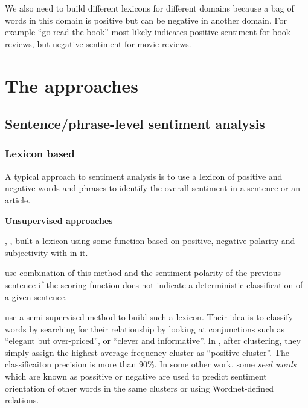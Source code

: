 \documentclass{article}
\begin{document}
\begin{multicols}{2}
    We also need to build different lexicons for different domains
because a bag of words in this domain is positive but can be negative in another
domain. For example ``go read the book'' most likely indicates positive
sentiment for book reviews, but negative sentiment for movie reviews.

 

\section{The approaches}

  \subsection{Sentence/phrase-level sentiment analysis}

    \subsubsection{Lexicon based}
      
        A typical approach to sentiment analysis is to use a lexicon of positive
  and negative words and phrases to identify the overall sentiment in a sentence
  or an article. 

        \textbf{Unsupervised approaches}

            \citet{Wiebe2000}, \citet{Turney2002}, \citet{Pan2010} built
a  lexicon using some function based on positive, negative polarity and
subjectivity  with in it.

            \citet{Liu98} use combination of this method and
the sentiment polarity of the previous sentence if the scoring function does
not indicate a deterministic classification of a given sentence.

            \citet{Hatzivassiloglou1997}
use a semi-supervised method to build such a lexicon. Their idea is to
classify words by searching for their relationship by looking at conjunctions 
such as ``elegant but over-priced'', or ``clever and informative''. In
\citet{Hatzivassiloglou1997}, after clustering, they simply assign the highest
average frequency cluster as ``positive cluster''. The classificaiton
precision is more than 90\%. In some other work, some \textit{seed words} which are
known as possitive or negative are used to predict sentiment orientation of other
words in the same clusters or using Wordnet-defined relations.      		
            

\end{multicols}
\end{document}
